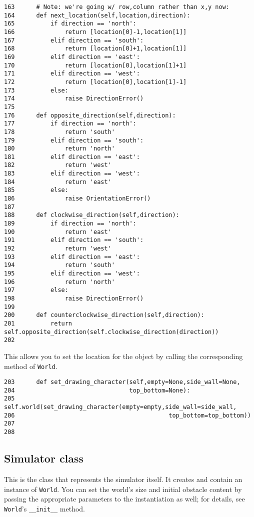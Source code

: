\documentclass[11pt]{tufte-handout}
\begin{document}
\begin{verbatim}
163      # Note: we're going w/ row,column rather than x,y now:
164      def next_location(self,location,direction):
165          if direction == 'north':
166              return [location[0]-1,location[1]]
167          elif direction == 'south':
168              return [location[0]+1,location[1]]
169          elif direction == 'east':
170              return [location[0],location[1]+1]            
171          elif direction == 'west':
172              return [location[0],location[1]-1]
173          else:
174              raise DirectionError()
175  
176      def opposite_direction(self,direction):
177          if direction == 'north':
178              return 'south'
179          elif direction == 'south':
180              return 'north'
181          elif direction == 'east':
182              return 'west'
183          elif direction == 'west':
184              return 'east'
185          else:
186              raise OrientationError()
187  
188      def clockwise_direction(self,direction):
189          if direction == 'north':
190              return 'east'
191          elif direction == 'south':
192              return 'west'
193          elif direction == 'east':
194              return 'south'
195          elif direction == 'west':
196              return 'north'
197          else:
198              raise DirectionError()
199  
200      def counterclockwise_direction(self,direction):
201          return self.opposite_direction(self.clockwise_direction(direction))
202  
\end{verbatim}

This allows you to set the location for the object by calling the corresponding method of \texttt{World}.

\begin{verbatim}
203      def set_drawing_character(self,empty=None,side_wall=None,
204                                top_bottom=None):
205          self.world(set_drawing_character(empty=empty,side_wall=side_wall,
206                                           top_bottom=top_bottom))
207  
208  
\end{verbatim}

\subsection{Simulator class}
\label{sec:org85738d3}

This is the class that represents the simulator itself.  It creates and contain an instance of \texttt{World}.  You can set the world's size and initial  obstacle content by passing the appropriate parameters to the instantiation as well; for details, see \texttt{World}'s \texttt{\_\_init\_\_} method.
\end{document}

